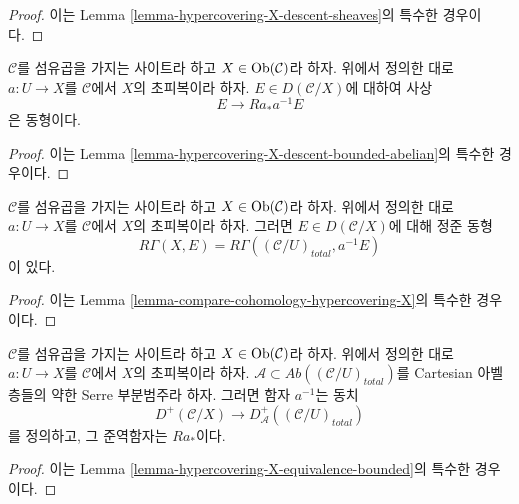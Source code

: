 \begin{proof}
이는 Lemma \ref{lemma-hypercovering-X-descent-sheaves}의 특수한 경우이다.
\end{proof}

\begin{lemma}
\label{lemma-hypercovering-X-simple-descent-bounded-abelian}
$\mathcal{C}$를 섬유곱을 가지는 사이트라 하고
$X \in \mathop{\mathrm{Ob}}\nolimits(\mathcal{C})$라 하자. 위에서 정의한 대로
$a : U \to X$를 $\mathcal{C}$에서 $X$의 초피복이라 하자.
$E \in D(\mathcal{C}/X)$에 대하여 사상
$$
E \longrightarrow Ra_*a^{-1}E
$$
은 동형이다.
\end{lemma}

\begin{proof}
이는 Lemma
\ref{lemma-hypercovering-X-descent-bounded-abelian}의 특수한 경우이다.
\end{proof}

\begin{lemma}
\label{lemma-compare-cohomology-hypercovering-X-simple}
$\mathcal{C}$를 섬유곱을 가지는 사이트라 하고
$X \in \mathop{\mathrm{Ob}}\nolimits(\mathcal{C})$라 하자. 위에서 정의한 대로
$a : U \to X$를 $\mathcal{C}$에서 $X$의 초피복이라 하자.
그러면 $E \in D(\mathcal{C}/X)$에 대해 정준 동형
$$
R\Gamma(X, E) = R\Gamma((\mathcal{C}/U)_{total}, a^{-1}E)
$$
이 있다.
\end{lemma}

\begin{proof}
이는 Lemma
\ref{lemma-compare-cohomology-hypercovering-X}의 특수한 경우이다.
\end{proof}

\begin{lemma}
\label{lemma-hypercovering-X-simple-equivalence-bounded}
$\mathcal{C}$를 섬유곱을 가지는 사이트라 하고
$X \in \mathop{\mathrm{Ob}}\nolimits(\mathcal{C})$라 하자. 위에서 정의한 대로
$a : U \to X$를 $\mathcal{C}$에서 $X$의 초피복이라 하자.
$\mathcal{A} \subset \textit{Ab}((\mathcal{C}/U)_{total})$를
Cartesian 아벨층들의 약한 Serre 부분범주라 하자. 그러면 함자
$a^{-1}$는 동치
$$
D^+(\mathcal{C}/X) \longrightarrow D_\mathcal{A}^+((\mathcal{C}/U)_{total})
$$
를 정의하고, 그 준역함자는 $Ra_*$이다.
\end{lemma}

\begin{proof}
이는 Lemma
\ref{lemma-hypercovering-X-equivalence-bounded}의 특수한 경우이다.
\end{proof}

